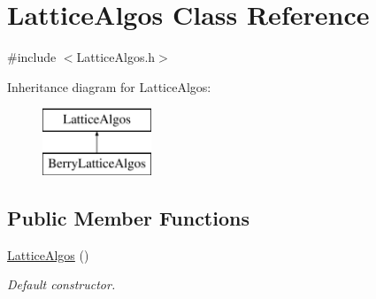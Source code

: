 \hypertarget{class_lattice_algos}{
\section{LatticeAlgos Class Reference}
\label{class_lattice_algos}
}


{\ttfamily \#include $<$LatticeAlgos.h$>$}

Inheritance diagram for LatticeAlgos:\begin{figure}[H]
\begin{center}
\leavevmode
\includegraphics[height=2.000000cm]{class_lattice_algos}
\end{center}
\end{figure}
\subsection*{Public Member Functions}
\begin{DoxyCompactItemize}
\item 
\hyperlink{class_lattice_algos_ae3f96fdf1928948a830de0ec273534c1}{LatticeAlgos} ()
\begin{DoxyCompactList}\small\item\em Default constructor. \item\end{DoxyCompactList}\end{DoxyCompactItemize}
